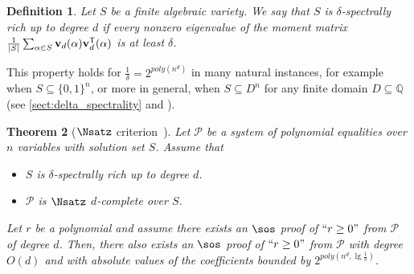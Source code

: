 \documentclass[11pt]{article}
\newtheorem{theorem}{Theorem}[section]
\newtheorem{definition}[theorem]{Definition}
\begin{document}
\begin{definition}
    Let $S$ be a finite algebraic variety. We say that $S$ is $\delta$-spectrally rich up to degree $d$ if every nonzero eigenvalue of the moment matrix $\frac{1}{|S|} \sum_{\alpha \in S} \mathbf{v}_d(\alpha)\mathbf{v}_d^{\sf{T}}(\alpha)$ is at least $\delta$.
\end{definition}
This property holds for $\frac{1}{\delta} = 2^{poly(n^d)}$ in many natural instances, for example when $S \subseteq \{0,1\}^n$, or more in general, when $S \subseteq D^n$ for any finite domain $D \subseteq \mathbb{Q}$ (see \cref{sect:delta_spectrality} and \cite{raghavendra_weitz2017}).

\begin{theorem}[$\Nsatz$ criterion~\cite{raghavendra_weitz2017}]\label{th:Nsatz_crit}
    Let $\mathcal{P}$ be a system of polynomial equalities over $n$ variables with solution set $S$. Assume that 
    \begin{itemize}
        \item [(1)] $S$ is $\delta$-spectrally rich up to degree $d$.
        \item [(2)] $\mathcal{P}$ is $\Nsatz$ $d$-complete over $S$.\label{d-comp}
    \end{itemize} 
    Let $r$ be a polynomial and assume there exists an $\sos$ proof of $``r \geq 0"$ from $\mathcal{P}$ of degree $d$. Then, there also exists an $\sos$ proof of $``r \geq 0"$ from $\mathcal{P}$ with degree $O(d)$ and with absolute values of the coefficients bounded by $2^{poly(n^d ,\lg \frac{1}{\delta})}$.
\end{theorem}
\end{document}

